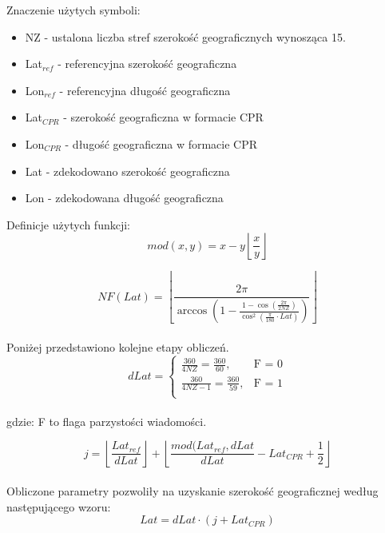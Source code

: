 \documentclass[eng,printmode]{mgr}
\newcommand{\floor}[1]{\left\lfloor #1 \right\rfloor}
\begin{document}
\noindent
Znaczenie użytych symboli:
\begin{itemize}
\item NZ - ustalona liczba stref szerokość geograficznych wynosząca 15.
\item Lat$_{ref}$ - referencyjna szerokość geograficzna
\item Lon$_{ref}$ - referencyjna długość geograficzna
\item Lat$_{CPR}$ - szerokość geograficzna w formacie CPR
\item Lon$_{CPR}$ - długość geograficzna w formacie CPR
\item Lat - zdekodowano szerokość geograficzna
\item Lon - zdekodowana długość geograficzna
\end{itemize}
\noindent
Definicje użytych funkcji:
\begin{equation}
mod(x, y) = x - y\floor{\frac{x}{y}}
\end{equation}

\begin{equation}
NF(Lat) = \floor{\frac{2\pi}{\arccos\left(1 - \frac{1 - \cos\left(\frac{2\pi}{2NZ}\right)}{\cos^2\left(\frac{\pi}{180} \cdot Lat\right)}\right)}}
\end{equation}
\\

\noindent
Poniżej przedstawiono kolejne etapy obliczeń.
\begin{equation}
\renewcommand*{\arraystretch}{1.3}
dLat= \left\{ \begin{array}{ll}

\frac{360}{4NZ} = \frac{360}{60}, & \textrm{F = 0}\\
\frac{360}{4NZ - 1} = \frac{360}{59}, & \textrm{F = 1}\\

\end{array} \right.
\end{equation}
\\
gdzie: F to flaga parzystości wiadomości.

\begin{equation}
j = \floor{\frac{Lat_{ref}}{dLat}} + \floor{\frac{mod(Lat_{ref},dLat}{dLat} - Lat_{CPR} + \frac{1}{2}}
\end{equation}
\\

Obliczone parametry pozwoliły na uzyskanie szerokość geograficznej według następującego wzoru:
\begin{equation}
Lat = dLat \cdot \left(j + Lat_{CPR}\right)
\end{equation}
\end{document}
